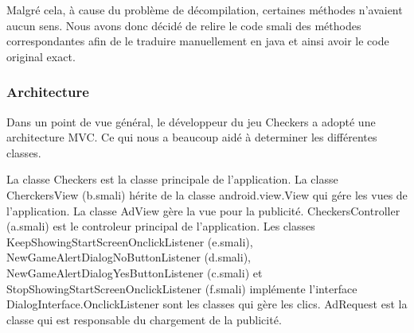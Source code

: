 Malgré cela, à cause du problème de décompilation, certaines méthodes n'avaient aucun sens.
Nous avons donc décidé de relire le code smali des méthodes correspondantes afin de le traduire manuellement en java et ainsi avoir le code original exact.

\subsubsection{Architecture}
Dans un point de vue général, le développeur du jeu Checkers a adopté une architecture MVC. Ce qui nous a beaucoup aidé à determiner les différentes 
classes. 
\begin{figure}[hp]
	      \begin{center}
	      \end{center}
\end{figure}
La classe Checkers est la classe principale de l’application.
La classe CherckersView (b.smali) hérite de la classe android.view.View qui gére les vues de l’application. La classe AdView gère la vue pour la publicité.
CheckersController (a.smali) est le controleur principal de l’application. Les classes KeepShowingStartScreenOnclickListener (e.smali), NewGameAlertDialogNoButtonListener (d.smali), NewGameAlertDialogYesButtonListener (c.smali) et StopShowingStartScreenOnclickListener (f.smali) implémente l'interface DialogInterface.OnclickListener sont les classes qui gère les clics.
AdRequest est la classe qui est responsable du chargement de la publicité.
